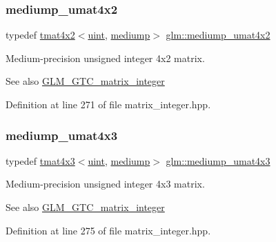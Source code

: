 \subsubsection{\texorpdfstring{mediump\_umat4x2}{mediump\_umat4x2}}
{\footnotesize\ttfamily typedef \mbox{\hyperlink{structglm_1_1tmat4x2}{tmat4x2}}$<$\mbox{\hyperlink{group__core__precision_ga4fd29415871152bfb5abd588334147c8}{uint}}, \mbox{\hyperlink{namespaceglm_a0f04f086094c747d227af4425893f545a6416f3ea0c9025fb21ed50c4d6620482}{mediump}}$>$ \mbox{\hyperlink{group__gtc__matrix__integer_ga9dd5ce011ca43d90cf1b94084c7e90ac}{glm\+::mediump\+\_\+umat4x2}}}

Medium-\/precision unsigned integer 4x2 matrix. \begin{DoxySeeAlso}{See also}
\mbox{\hyperlink{group__gtc__matrix__integer}{G\+L\+M\+\_\+\+G\+T\+C\+\_\+matrix\+\_\+integer}} 
\end{DoxySeeAlso}


Definition at line 271 of file matrix\+\_\+integer.\+hpp.

\mbox{\label{group__gtc__matrix__integer_gac91ed5aa76fe160d5ab5d31e2b94d95b}} 
\subsubsection{\texorpdfstring{mediump\_umat4x3}{mediump\_umat4x3}}
{\footnotesize\ttfamily typedef \mbox{\hyperlink{structglm_1_1tmat4x3}{tmat4x3}}$<$\mbox{\hyperlink{group__core__precision_ga4fd29415871152bfb5abd588334147c8}{uint}}, \mbox{\hyperlink{namespaceglm_a0f04f086094c747d227af4425893f545a6416f3ea0c9025fb21ed50c4d6620482}{mediump}}$>$ \mbox{\hyperlink{group__gtc__matrix__integer_gac91ed5aa76fe160d5ab5d31e2b94d95b}{glm\+::mediump\+\_\+umat4x3}}}

Medium-\/precision unsigned integer 4x3 matrix. \begin{DoxySeeAlso}{See also}
\mbox{\hyperlink{group__gtc__matrix__integer}{G\+L\+M\+\_\+\+G\+T\+C\+\_\+matrix\+\_\+integer}} 
\end{DoxySeeAlso}


Definition at line 275 of file matrix\+\_\+integer.\+hpp.

\mbox{\label{group__gtc__matrix__integer_ga7141a9d9f1c26521e397be34d19c1b8f}} 
